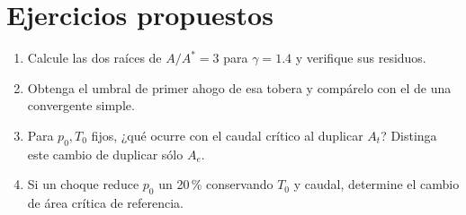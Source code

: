 \section{Ejercicios propuestos}
\begin{enumerate}
\item Calcule las dos raíces de $A/A^*=3$ para $\gamma=1.4$ y verifique sus residuos.
\item Obtenga el umbral de primer ahogo de esa tobera y compárelo con el de una convergente simple.
\item Para $p_0,T_0$ fijos, ¿qué ocurre con el caudal crítico al duplicar $A_t$? Distinga este cambio de duplicar sólo $A_e$.
\item Si un choque reduce $p_0$ un 20\,\% conservando $T_0$ y caudal, determine el cambio de área crítica de referencia.
\end{enumerate}


\studiumchaptercheck
